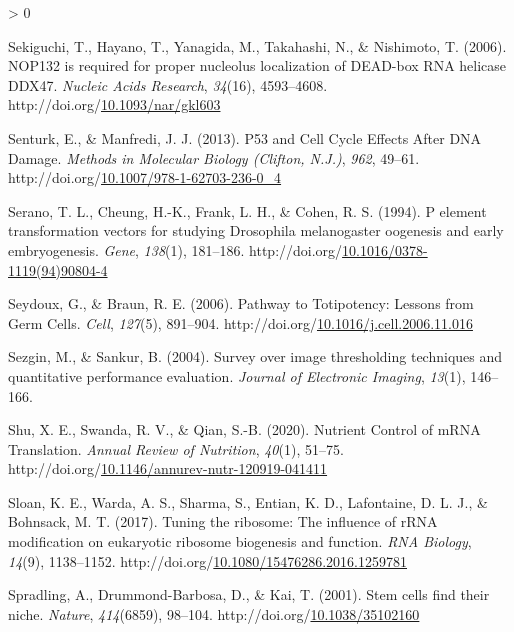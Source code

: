 \documentclass[12pt,oneside]{reedthesis}
\newlength{\cslhangindent}
\newenvironment{CSLReferences}[2] %
 {%
  \setlength{\parindent}{0pt}
  \ifodd #1 \everypar{\setlength{\hangindent}{\cslhangindent}}\ignorespaces\fi
  \ifnum #2 > 0
  \setlength{\parskip}{#2\baselineskip}
  \fi
 }%
 {}
\begin{document}
\begin{CSLReferences}{1}{0}
\leavevmode\hypertarget{ref-sekiguchiNOP132RequiredProper2006}{}%
Sekiguchi, T., Hayano, T., Yanagida, M., Takahashi, N., \& Nishimoto, T. (2006). {NOP132} is required for proper nucleolus localization of {DEAD-box RNA} helicase {DDX47}. \emph{Nucleic Acids Research}, \emph{34}(16), 4593--4608. http://doi.org/\href{https://doi.org/10.1093/nar/gkl603}{10.1093/nar/gkl603}

\leavevmode\hypertarget{ref-senturkP53CellCycle2013}{}%
Senturk, E., \& Manfredi, J. J. (2013). P53 and {Cell Cycle Effects After DNA Damage}. \emph{Methods in Molecular Biology (Clifton, N.J.)}, \emph{962}, 49--61. http://doi.org/\href{https://doi.org/10.1007/978-1-62703-236-0_4}{10.1007/978-1-62703-236-0\_4}

\leavevmode\hypertarget{ref-seranoElementTransformationVectors1994}{}%
Serano, T. L., Cheung, H.-K., Frank, L. H., \& Cohen, R. S. (1994). P element transformation vectors for studying {Drosophila} melanogaster oogenesis and early embryogenesis. \emph{Gene}, \emph{138}(1), 181--186. http://doi.org/\href{https://doi.org/10.1016/0378-1119(94)90804-4}{10.1016/0378-1119(94)90804-4}

\leavevmode\hypertarget{ref-Seydoux2006}{}%
Seydoux, G., \& Braun, R. E. (2006). Pathway to {Totipotency}: {Lessons} from {Germ Cells}. \emph{Cell}, \emph{127}(5), 891--904. http://doi.org/\href{https://doi.org/10.1016/j.cell.2006.11.016}{10.1016/j.cell.2006.11.016}

\leavevmode\hypertarget{ref-sezginSurveyImageThresholding2004}{}%
Sezgin, M., \& Sankur, B. (2004). Survey over image thresholding techniques and quantitative performance evaluation. \emph{Journal of Electronic Imaging}, \emph{13}(1), 146--166.

\leavevmode\hypertarget{ref-shuNutrientControlMRNA2020}{}%
Shu, X. E., Swanda, R. V., \& Qian, S.-B. (2020). Nutrient {Control} of {mRNA Translation}. \emph{Annual Review of Nutrition}, \emph{40}(1), 51--75. http://doi.org/\href{https://doi.org/10.1146/annurev-nutr-120919-041411}{10.1146/annurev-nutr-120919-041411}

\leavevmode\hypertarget{ref-Sloan2017e}{}%
Sloan, K. E., Warda, A. S., Sharma, S., Entian, K. D., Lafontaine, D. L. J., \& Bohnsack, M. T. (2017). Tuning the ribosome: {The} influence of {rRNA} modification on eukaryotic ribosome biogenesis and function. \emph{RNA Biology}, \emph{14}(9), 1138--1152. http://doi.org/\href{https://doi.org/10.1080/15476286.2016.1259781}{10.1080/15476286.2016.1259781}

\leavevmode\hypertarget{ref-spradlingStemCellsFind2001}{}%
Spradling, A., Drummond-Barbosa, D., \& Kai, T. (2001). Stem cells find their niche. \emph{Nature}, \emph{414}(6859), 98--104. http://doi.org/\href{https://doi.org/10.1038/35102160}{10.1038/35102160}


\end{CSLReferences}
\end{document}
